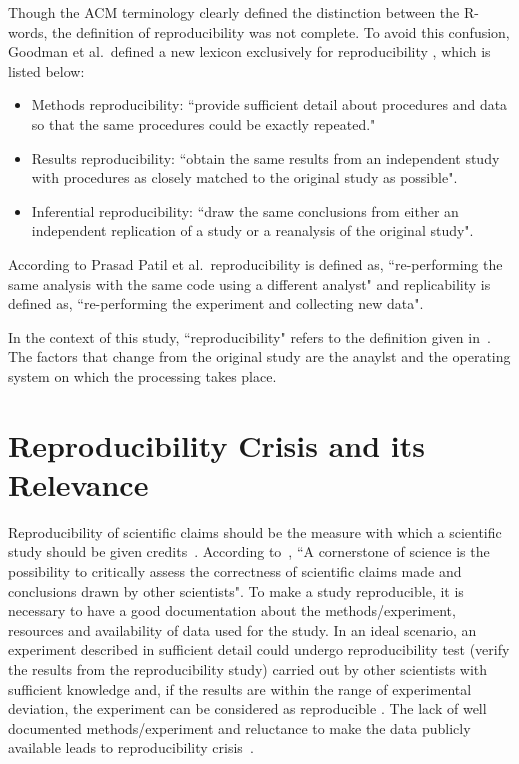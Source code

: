 Though the ACM terminology clearly defined the distinction between the R-words, the definition of reproducibility was not complete. To avoid this confusion, Goodman et al.\, defined a new lexicon exclusively for reproducibility \cite{Goodman2016}, which is listed below:

\begin{itemize}
\item {Methods reproducibility: ``provide sufficient detail about procedures and data so that the same procedures could be exactly repeated."}
\item {Results reproducibility: ``obtain the same results from an independent study with procedures as closely matched to the original study as possible".}
\item {Inferential reproducibility: ``draw the same conclusions from either an independent replication of a study or a reanalysis of the original study".}
\end{itemize}

According to Prasad Patil et al.\, reproducibility is defined as, ``re-performing the same analysis with the same code using a different analyst" and replicability is defined as, ``re-performing the experiment and collecting new data".

In the context of this study, ``reproducibility" refers to the definition given in~\cite{Patil2016}. The factors that change from the original study are the anaylst and the operating system on which the processing takes place.

\section{Reproducibility Crisis and its Relevance}
Reproducibility of scientific claims should be the measure with which a scientific study should be given credits~\cite{aac4716}. According to~\cite{Plesser2018}, ``A cornerstone of science is the possibility to critically assess the correctness of scientific claims made and conclusions drawn by other scientists".
To make a study reproducible, it is necessary to have a good documentation about the methods/experiment, resources and availability of data used for the study. In an ideal scenario, an experiment described in sufficient detail could undergo reproducibility test (verify the results from the reproducibility study) carried out by other scientists with sufficient knowledge and, if the results are within the range of experimental deviation, the experiment can be considered as reproducible \cite{Plesser2018}. The lack of well documented methods/experiment and reluctance to make the data publicly available leads to reproducibility crisis~\cite{Baker2016}.

